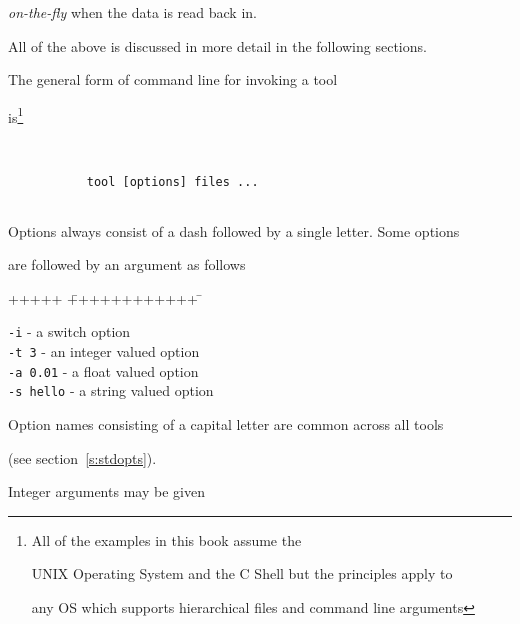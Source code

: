 \textit{on-the-fly} when the data is read back in.





All of the above is discussed in more detail in the following sections.










The general form of command line for invoking a tool 


is\footnote{All of the examples in this book assume the


UNIX Operating System and the C Shell but the principles apply to


any OS which supports hierarchical files and command line arguments}




\begin{verbatim}


           tool [options] files ...


\end{verbatim}


Options always consist of a dash followed by a single letter.  Some options


are followed by an argument as follows


\begin{tabbing}


+++++ \= ++++++++++++ \=  \kill


\>           \texttt{-i} \>  - a switch option \\


\>           \texttt{-t 3} \> - an integer valued option \\


\>           \texttt{-a 0.01} \> - a float valued option \\


\>           \texttt{-s hello} \> - a string valued option 


\end{tabbing}   


Option names consisting of a capital letter are common across all tools


(see section~\ref{s:stdopts}).


Integer arguments may be given 


